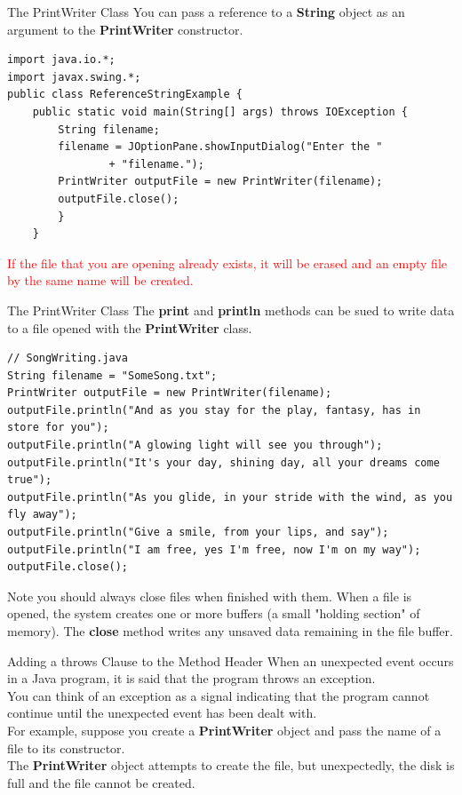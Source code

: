 \documentclass[11pt]{beamer}
\newcommand{\red}[1]{\textcolor{red}{#1}}
\begin{document}
\begin{frame}[fragile]{The PrintWriter Class}
    You can pass a reference to a \textbf{String} object as an argument to the \textbf{PrintWriter} constructor.
    \begin{lstlisting}[basicstyle=\ttfamily\footnotesize]
import java.io.*;
import javax.swing.*;
public class ReferenceStringExample {
	public static void main(String[] args) throws IOException {
		String filename;
		filename = JOptionPane.showInputDialog("Enter the "
				+ "filename.");
		PrintWriter outputFile = new PrintWriter(filename);
		outputFile.close();
		}
	}
    \end{lstlisting}
\red{If the file that you are opening already exists, it will be erased and an empty file by the same name will be created.}
\end{frame}

\begin{frame}[fragile]{The PrintWriter Class}
    The \textbf{print} and \textbf{println} methods can be sued to write data to a file opened with the \textbf{PrintWriter} class.
    \begin{lstlisting}[basicstyle=\ttfamily\scriptsize]
// SongWriting.java
String filename = "SomeSong.txt";
PrintWriter outputFile = new PrintWriter(filename);
outputFile.println("And as you stay for the play, fantasy, has in store for you");
outputFile.println("A glowing light will see you through");
outputFile.println("It's your day, shining day, all your dreams come true");
outputFile.println("As you glide, in your stride with the wind, as you fly away");
outputFile.println("Give a smile, from your lips, and say");
outputFile.println("I am free, yes I'm free, now I'm on my way");
outputFile.close();
    \end{lstlisting}
\scriptsize{
Note you should always close files when finished with them. When a file is opened, the system creates one or more buffers (a small "holding section" of memory). The \textbf{close} method writes any unsaved data remaining in the file buffer.}
\end{frame}

\begin{frame}{Adding a throws Clause to the Method Header}
When an unexpected event occurs in a Java program, it is said that the program throws an exception. \\ 
\vspace{1em}
You can think of an exception as a signal indicating that the program cannot continue until the unexpected event has been dealt with. \\ 
\vspace{1em} 
For example, suppose you create a \textbf{PrintWriter} object and pass the name of a file to its constructor. \\
\vspace{1em} 
The \textbf{PrintWriter} object attempts to create the file, but unexpectedly, the disk is full and the file cannot be created. 
\end{frame}
\end{document}
